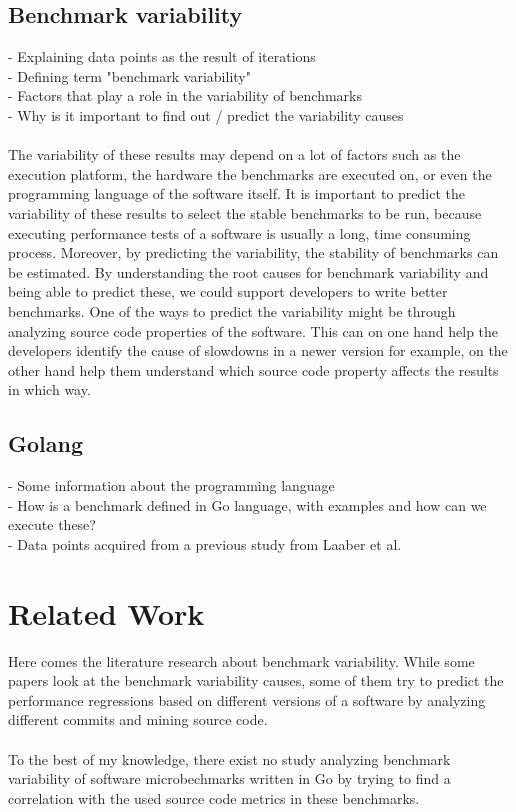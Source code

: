\documentclass{seal_thesis}
\begin{document}
\section{Benchmark variability}
- Explaining data points as the result of iterations \\
- Defining term "benchmark variability" \\
- Factors that play a role in the variability of benchmarks\\
- Why is it important to find out / predict the variability causes \\
\\
The variability of these results may depend on a lot of factors such as the execution platform,
the hardware the benchmarks are executed on, or even the programming language of the
software itself. It is important to predict the variability of these results to select the stable
benchmarks to be run, because executing performance tests of a software is usually a long,
time consuming process. Moreover, by predicting the variability, the stability of benchmarks can
be estimated. By understanding the root causes for benchmark variability and being able to predict these, we could support developers to write better benchmarks. One of the ways to predict the variability might be through analyzing source code properties of the software. This can on one hand help the developers identify the cause of slowdowns in a newer version for example, on the other hand help them understand which source code property affects the
results in which way.

\section{Golang}
- Some information about the programming language \\
- How is a benchmark defined in Go language, with examples and how can we execute these? \\
- Data points acquired from a previous study from Laaber et al. \\


\chapter{Related Work}
Here comes the literature research about benchmark variability. While some papers look at the benchmark variability causes, some of them try to predict the performance regressions based on different versions of a software by analyzing different commits and mining source code. \\
\\
To the best of my knowledge, there exist no study analyzing benchmark variability of software microbechmarks written in Go by trying to find a correlation with the used source code metrics in these benchmarks.
\end{document}

